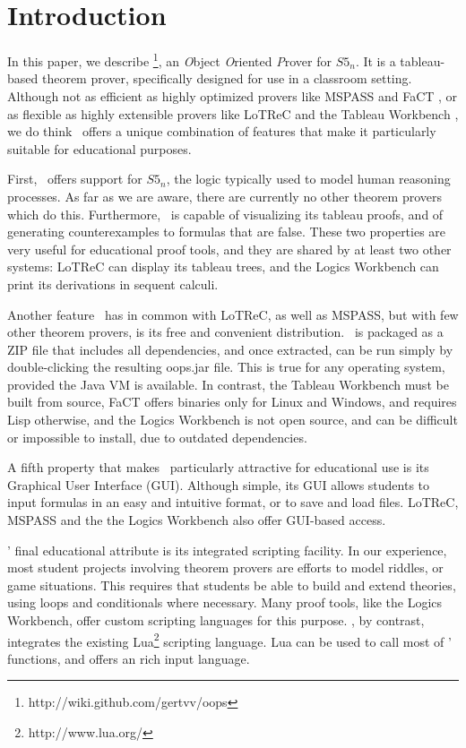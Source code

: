\section{Introduction}
\label{sec:introduction}

In this paper, we describe \oops\footnote{http://wiki.github.com/gertvv/oops},
an {\it O}bject {\it O}riented {\it P}rover for $S5_n$.
It is a tableau-based theorem prover, specifically designed for use in a
classroom setting.
Although not as efficient as highly optimized provers like MSPASS
\citep{mspass2000} and FaCT \citep{fact1998}, or as flexible as highly
extensible provers like LoTReC \citep{lotrec2005} and the Tableau Workbench
\citep{twb2009}, we do think \oops\ offers a unique combination of features
that make it particularly suitable for educational purposes.

First, \oops\ offers support for $S5_n$, the logic typically used to model
human reasoning processes.
As far as we are aware, there are currently no other theorem provers which do
this.
Furthermore, \oops\ is capable of visualizing its tableau proofs, and of
generating counterexamples to formulas that are false.
These two properties are very useful for educational proof tools, and they are
shared by at least two other systems: LoTReC can display its tableau trees,
and the Logics Workbench \citep{heuerding1996} can print its derivations in
sequent calculi.

Another feature \oops\ has in common with LoTReC, as well as MSPASS, but with
few other theorem provers, is its free and convenient distribution.
\oops\ is packaged as a ZIP file that includes all dependencies, and once
extracted, can be run simply by double-clicking the resulting oops.jar file.
This is true for any operating system, provided the Java VM is available.
In contrast, the Tableau Workbench must be built from source,
FaCT offers binaries only for Linux and Windows, and requires
Lisp otherwise, and the Logics Workbench is not open source, and can be difficult
or impossible to install, due to outdated dependencies.

A fifth property that makes \oops\ particularly attractive for educational use
is its Graphical User Interface (GUI).
Although simple, its GUI allows students to input formulas in an easy and
intuitive format, or to save and load files.  LoTReC, MSPASS and the the Logics Workbench also offer GUI-based access.

\oops' final educational attribute is its integrated scripting facility.
In our experience, most student projects involving theorem provers are efforts
to model riddles, or game situations.
This requires that students be able to build and extend theories, using loops
and conditionals where necessary.
Many proof tools, like the Logics Workbench, offer custom scripting languages
for this purpose.
\oops, by contrast, integrates the existing Lua\footnote{http://www.lua.org/}
scripting language.
Lua can be used to call most of \oops' functions, and offers an  rich input
language.

